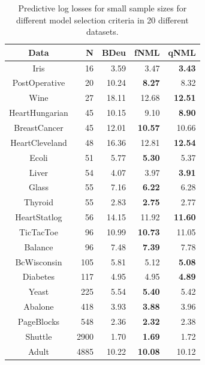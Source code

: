 \documentclass[letterpaper]{article}
\begin{document}
\begin{table}
\centering
\begin{tabular}{crrrr}
\toprule
           Data &     N &   BDeu &            fNML &            qNML \\
\midrule
           Iris &    16 &   3.59 &            3.47 &   \textbf{3.43} \\
  PostOperative &    20 &  10.24 &   \textbf{8.27} &            8.32 \\
           Wine &    27 &  18.11 &           12.68 &  \textbf{12.51} \\
 HeartHungarian &    45 &  10.15 &            9.10 &   \textbf{8.90} \\
   BreastCancer &    45 &  12.01 &  \textbf{10.57} &           10.66 \\
 HeartCleveland &    48 &  16.36 &           12.81 &  \textbf{12.54} \\
          Ecoli &    51 &   5.77 &   \textbf{5.30} &            5.37 \\
          Liver &    54 &   4.07 &            3.97 &   \textbf{3.91} \\
          Glass &    55 &   7.16 &   \textbf{6.22} &            6.28 \\
        Thyroid &    55 &   2.83 &   \textbf{2.75} &            2.77 \\
   HeartStatlog &    56 &  14.15 &           11.92 &  \textbf{11.60} \\
      TicTacToe &    96 &  10.99 &  \textbf{10.73} &           11.05 \\
        Balance &    96 &   7.48 &   \textbf{7.39} &            7.78 \\
    BcWisconsin &   105 &   5.81 &            5.12 &   \textbf{5.08} \\
       Diabetes &   117 &   4.95 &            4.95 &   \textbf{4.89} \\
          Yeast &   225 &   5.54 &   \textbf{5.40} &            5.42 \\
        Abalone &   418 &   3.93 &   \textbf{3.88} &            3.96 \\
     PageBlocks &   548 &   2.36 &   \textbf{2.32} &            2.38 \\
        Shuttle &  2900 &   1.70 &   \textbf{1.69} &            1.72 \\
          Adult &  4885 &  10.22 &  \textbf{10.08} &           10.12 \\
\bottomrule
\end{tabular}
\caption{Predictive log losses for small sample sizes for different model selection criteria in 20 different datasets.}
\label{tbl:preds}
	\end{table}
\end{document}
